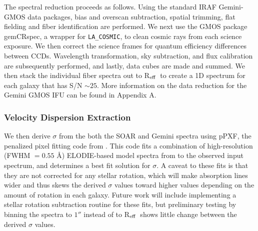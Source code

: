 \documentclass[iop,apj]{emulateapj}
\newcommand{\Reff}{R$_{\rm eff}$}
\begin{document}
The spectral reduction proceeds as follows. Using the standard IRAF Gemini-GMOS data packages, bias and overscan subtraction, spatial trimming, flat fielding and fiber identification are performed. We next use the GMOS package gemCRspec, a wrapper for \texttt{LA\_COSMIC}, to clean cosmic rays from each science exposure. We then correct the science frames for quantum efficiency differences between CCDs. Wavelength transformation, sky subtraction, and flux calibration are subsequently performed, and lastly, data cubes are made and summed. We then stack the individual fiber spectra out to \Reff\ to create a 1D spectrum for each galaxy that has S/N $\sim25$. More information on the data reduction for the Gemini GMOS IFU can be found in  Appendix A.

\subsubsection{Velocity Dispersion Extraction}

\noindent We then derive $\sigma$ from the both the SOAR and Gemini spectra using {\sc pPXF}, the penalized pixel fitting code from \citet{Cappellari2004}. This code fits a combination of high-resolution (FWHM $= 0.55$ \AA) ELODIE-based model spectra from \citet{Maraston2011} to the observed input spectrum, and determines a best fit solution for $\sigma$. A caveat to these fits is that they are not corrected for any stellar rotation, which will make absorption lines wider and thus skews the derived $\sigma$ values toward higher values depending on the amount of rotation in each galaxy. Future work will include implementing a stellar rotation subtraction routine for these fits, but preliminary testing by binning the spectra to $1''$ instead of to \Reff\ shows little change between the derived $\sigma$ values.
\end{document}
